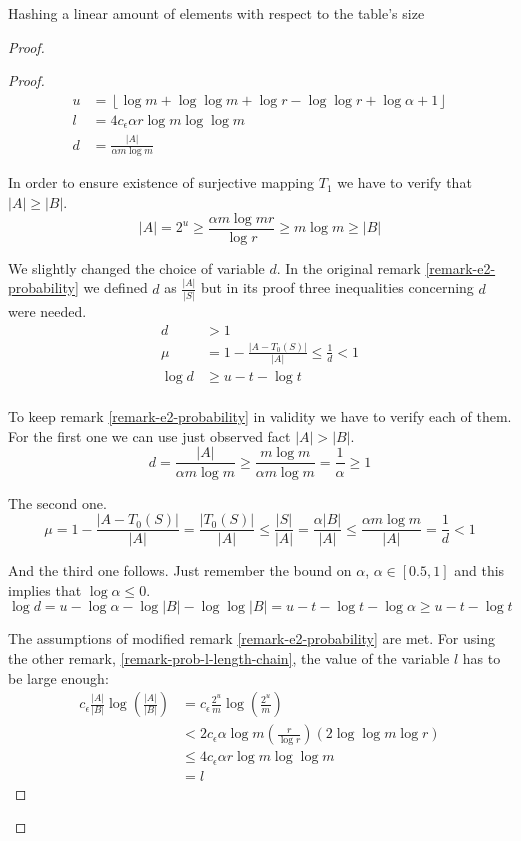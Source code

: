 \begin{section}{Hashing a linear amount of elements with respect to the table's size}
\begin{proof}
\begin{proof}
\[
\begin{split}
	u & = \left\lfloor \log m + \log \log m + \log r - \log \log r + \log \alpha + 1 \right\rfloor \\
	l & = 4 c_\epsilon \alpha r \log m \log \log m \\
	d & = \frac{|A|}{\alpha m \log m}
\end{split}
\]

In order to ensure existence of surjective mapping $T_1$ we have to verify that $|A| \geq |B|$.
\[
	|A| = 2 ^ u \geq \frac{\alpha m \log m r}{\log r} \geq m \log m \geq |B|
\]

We slightly changed the choice of variable $d$. In the original remark \ref{remark-e2-probability} we defined $d$ as $\frac{|A|}{|S|}$ but in its proof three inequalities concerning $d$ were needed.
\[
\begin{split}
	d & > 1 \\
	\mu & = 1 - \frac{|A - T_0(S)|}{|A|} \leq \frac{1}{d} < 1 \\
	\log d & \geq u - t - \log t \\
\end{split}
\]

To keep remark \ref{remark-e2-probability} in validity we have to verify each of them. For the first one we can use just observed fact $|A| > |B|$.
\[
	d = \frac{|A|}{\alpha m \log m} \geq \frac{m \log m}{\alpha m \log m} = \frac{1}{\alpha} \geq 1
\]

The second one.
\[
	\mu = 1 - \frac{|A - T_0(S)|}{|A|} = \frac{|T_0(S)|}{|A|} \leq \frac{|S|}{|A|} = \frac{\alpha |B|}{|A|} \leq \frac{\alpha m \log m}{|A|} = \frac{1}{d} < 1
\]

And the third one follows. Just remember the bound on $\alpha$, $\alpha \in \left[0.5, 1\right]$ and this implies that $\log \alpha \leq 0$.
\[
	\log d = u - \log \alpha - \log |B| - \log \log |B| = u - t - \log t - \log \alpha \geq u - t - \log t
\]

The assumptions of modified remark \ref{remark-e2-probability} are met. For using the other remark, \ref{remark-prob-l-length-chain}, the value of the variable $l$ has to be large enough:
\[
\begin{split}
c_{\epsilon} \frac{|A|}{|B|} \log \left(\frac{|A|}{|B|}\right) 
	& = c_{\epsilon} \frac{2^u}{m} \log \left(\frac{2^u}{m}\right) \\
	& < 2 c_{\epsilon} \alpha \log m \left( \frac{r}{\log r} \right) \left(2 \log \log m \log r \right) \\
	& \leq 4 c_{\epsilon} \alpha r \log m \log \log m \\
	& = l
\end{split}
\]


\end{proof}
\end{proof}
\end{section}
